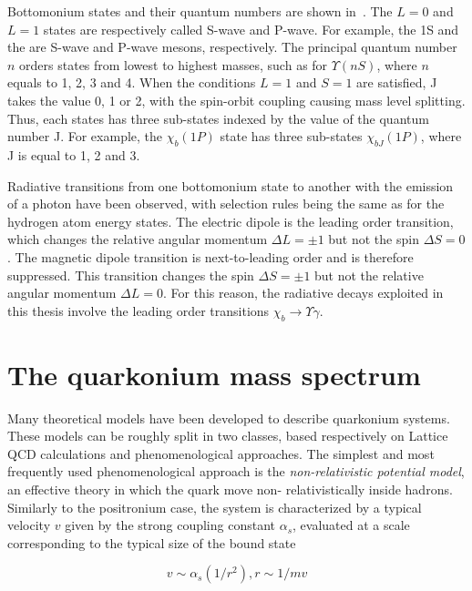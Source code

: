 



Bottomonium states and their quantum numbers are shown
in~. The $L = 0$ and $L = 1$ states are respectively
called S-wave and P-wave. For example, the \Y1S and the \chiboneOneP are S-wave and 
P-wave mesons, respectively. The principal quantum number $n$ orders states from lowest to highest
masses, such as for $\Upsilon(nS)$, where $n$ equals to 1, 2, 3 and 4. When the
conditions $L = 1$ and $S = 1$ are satisfied, J takes the value 0, 1 or 2, with the spin-orbit coupling 
causing mass level splitting. Thus,
each \chib states has three sub-states indexed by the value of the quantum
number J. For example, the $\chi_b(1P)$ state has three sub-states $\chi_{bJ}(1P)$,
where J is equal to 1, 2 and 3.

Radiative transitions from one bottomonium state to another with the emission of a photon 
have been observed, with selection rules being the same as for the hydrogen atom energy states. 
The electric dipole is the leading order transition, which changes the relative angular
momentum $\Delta L  = \pm 1$ but not the spin $\Delta S = 0$. The magnetic
dipole transition is next-to-leading order and is therefore suppressed. 
This transition changes the spin $\Delta S = \pm 1$ but not the relative
angular momentum $\Delta L = 0$. For this reason, the radiative decays exploited in 
this thesis involve the leading order transitions $\chi_b \rightarrow \Upsilon \gamma$. 

\section{The quarkonium mass spectrum}

Many theoretical models have been developed to describe quarkonium systems.
These models can be roughly split in two classes, based respectively on Lattice
QCD calculations and phenomenological approaches. The simplest and most
frequently used phenomenological approach is the {\it non-relativistic
potential model}, an effective theory in which the quark move non-
relativistically inside hadrons. Similarly to the positronium case, the system
is characterized by a typical velocity $v$ given by the strong coupling constant
$\alpha_s$, evaluated at a scale corresponding to the typical size of the bound
state

\begin{equation}
v \sim \alpha_s(1/r^2), r \sim 1/mv
\end{equation}

